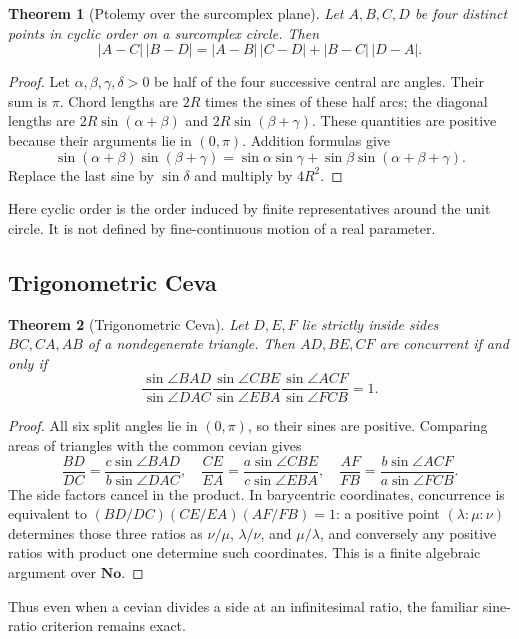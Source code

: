 \documentclass[11pt,letterpaper]{article}
\newtheorem{theorem}{Theorem}[section]
\theoremstyle{definition}
\theoremstyle{remark}
\newcommand{\No}{\mathbf{No}}
\numberwithin{equation}{section}
\begin{document}
\begin{theorem}[Ptolemy over the surcomplex plane]\label{thm:ptolemy}
Let $A,B,C,D$ be four distinct points in cyclic order on a surcomplex circle. Then
\begin{equation}\label{eq:ptolemy}
 |A-C|\,|B-D|
 =|A-B|\,|C-D|+|B-C|\,|D-A|.
\end{equation}
\end{theorem}
\begin{proof}
Let $\alpha,\beta,\gamma,\delta>0$ be half of the four successive central arc angles. Their sum is $\pi$. Chord lengths are $2R$ times the sines of these half arcs; the diagonal lengths are $2R\sin(\alpha+\beta)$ and $2R\sin(\beta+\gamma)$. These quantities are positive because their arguments lie in $(0,\pi)$. Addition formulas give
\[
 \sin(\alpha+\beta)\sin(\beta+\gamma)
 =\sin\alpha\sin\gamma+
   \sin\beta\sin(\alpha+\beta+\gamma).
\]
Replace the last sine by $\sin\delta$ and multiply by $4R^2$.
\end{proof}
Here cyclic order is the order induced by finite representatives around the unit circle. It is not defined by fine-continuous motion of a real parameter.

\subsection{Trigonometric Ceva}
\begin{theorem}[Trigonometric Ceva]\label{thm:ceva}
Let $D,E,F$ lie strictly inside sides $BC,CA,AB$ of a nondegenerate triangle. Then $AD,BE,CF$ are concurrent if and only if
\begin{equation}\label{eq:ceva}
 \frac{\sin\angle BAD}{\sin\angle DAC}
 \frac{\sin\angle CBE}{\sin\angle EBA}
 \frac{\sin\angle ACF}{\sin\angle FCB}=1.
\end{equation}
\end{theorem}
\begin{proof}
All six split angles lie in $(0,\pi)$, so their sines are positive. Comparing areas of triangles with the common cevian gives
\[
 \frac{BD}{DC}=\frac{c\sin\angle BAD}{b\sin\angle DAC},
\quad
 \frac{CE}{EA}=\frac{a\sin\angle CBE}{c\sin\angle EBA},
\quad
 \frac{AF}{FB}=\frac{b\sin\angle ACF}{a\sin\angle FCB}.
\]
The side factors cancel in the product. In barycentric coordinates, concurrence is equivalent to
$(BD/DC)(CE/EA)(AF/FB)=1$: a positive point $(\lambda:\mu:\nu)$ determines those three ratios as $\nu/\mu$, $\lambda/\nu$, and $\mu/\lambda$, and conversely any positive ratios with product one determine such coordinates. This is a finite algebraic argument over $\No$.
\end{proof}
Thus even when a cevian divides a side at an infinitesimal ratio, the familiar sine-ratio criterion remains exact.
\end{document}
